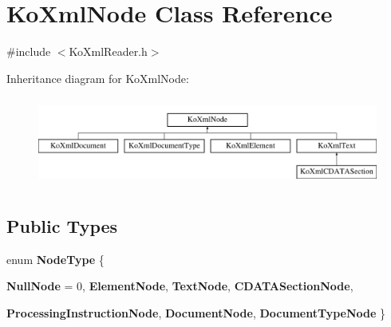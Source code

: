 \hypertarget{classKoXmlNode}{
\section{KoXmlNode Class Reference}
\label{classKoXmlNode}
}


{\ttfamily \#include $<$KoXmlReader.h$>$}

Inheritance diagram for KoXmlNode:\begin{figure}[H]
\begin{center}
\leavevmode
\includegraphics[height=2.97872cm]{classKoXmlNode}
\end{center}
\end{figure}
\subsection*{Public Types}
\begin{DoxyCompactItemize}
\item 
enum {\bfseries NodeType} \{ \par
{\bfseries NullNode} =  0, 
{\bfseries ElementNode}, 
{\bfseries TextNode}, 
{\bfseries CDATASectionNode}, 
\par
{\bfseries ProcessingInstructionNode}, 
{\bfseries DocumentNode}, 
{\bfseries DocumentTypeNode}
 \}
\end{DoxyCompactItemize}
